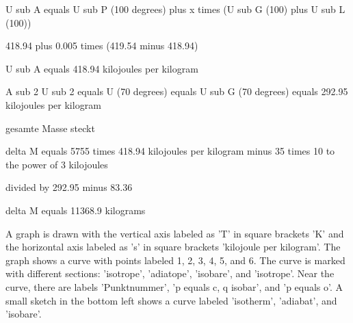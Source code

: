 U sub A equals U sub P (100 degrees) plus x times (U sub G (100) plus U sub L (100))

418.94 plus 0.005 times (419.54 minus 418.94)

U sub A equals 418.94 kilojoules per kilogram

A sub 2 U sub 2 equals U (70 degrees) equals U sub G (70 degrees) equals 292.95 kilojoules per kilogram

gesamte Masse steckt

delta M equals 5755 times 418.94 kilojoules per kilogram minus 35 times 10 to the power of 3 kilojoules

divided by 292.95 minus 83.36

delta M equals 11368.9 kilograms

A graph is drawn with the vertical axis labeled as 'T' in square brackets 'K' and the horizontal axis labeled as 's' in square brackets 'kilojoule per kilogram'. The graph shows a curve with points labeled 1, 2, 3, 4, 5, and 6. The curve is marked with different sections: 'isotrope', 'adiatope', 'isobare', and 'isotrope'. Near the curve, there are labels 'Punktnummer', 'p equals c, q isobar', and 'p equals o'. A small sketch in the bottom left shows a curve labeled 'isotherm', 'adiabat', and 'isobare'.